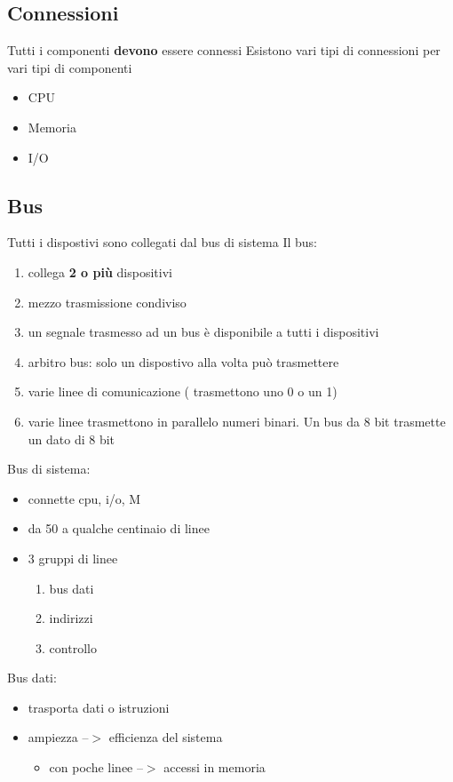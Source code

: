 \documentclass[12pt, a4paper]{article}
\theoremstyle{break}
\theoremstyle{lemma}
\theoremstyle{lemma}
\theoremstyle{lemma}
\begin{document}
\subsection{Connessioni}
Tutti i componenti \textbf{devono} essere connessi \newline
Esistono vari tipi di connessioni per vari tipi di componenti
\begin{itemize}
	\item CPU
	\item Memoria 
	\item I/O
\end{itemize}

\subsection{Bus}
Tutti i dispostivi sono collegati dal bus di sistema \newline
Il bus:
\begin{enumerate}
	\item collega \textbf{2 o più} dispositivi
	\item mezzo trasmissione condiviso
	\item un segnale trasmesso ad un bus è disponibile a tutti i dispositivi
	\item arbitro bus: solo un dispostivo alla volta può trasmettere
	\item varie linee di comunicazione ( trasmettono uno 0 o un 1)
	\item varie linee trasmettono in parallelo numeri binari. Un bus da 8 bit trasmette un dato di 8 bit
\end{enumerate}

Bus di sistema:
\begin{itemize}
	\item connette cpu, i/o, M
	\item da 50 a qualche centinaio di linee
	\item 3 gruppi di linee
	\begin{enumerate}
		\item bus dati
		\item indirizzi
		\item controllo
	\end{enumerate}
\end{itemize}

Bus dati:
\begin{itemize}
	\item trasporta dati o istruzioni
	\item ampiezza --$ > $ efficienza  del sistema
	\begin{itemize}
		\item con poche linee --$>$ accessi in memoria
	\end{itemize}
\end{itemize}
\end{document}
